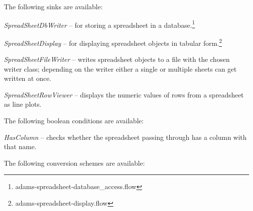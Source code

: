 \documentclass[a4paper]{book}
\begin{document}
The following sinks are available:
\begin{tight_itemize}
	\item \textit{SpreadSheetDbWriter} -- for storing a spreadsheet in a 
	database.\footnote{adams-spreadsheet-database\_access.flow}
	\item \textit{SpreadSheetDisplay} -- for displaying spreadsheet objects
	in tabular form.\footnote{adams-spreadsheet-display.flow}
	\item \textit{SpreadSheetFileWriter} -- writes spreadsheet objects to a file
	with the chosen writer class; depending on the writer either a single or
	multiple sheets can get written at once.
	\item \textit{SpreadSheetRowViewer} -- displays the numeric values of
	rows from a spreadsheet as line plots.
\end{tight_itemize}
The following boolean conditions are available:
\begin{tight_itemize}
	\item \textit{HasColumn} -- checks whether the spreadsheet passing through
	has a column with that name.
\end{tight_itemize}
The following conversion schemes are available:
\end{document}
